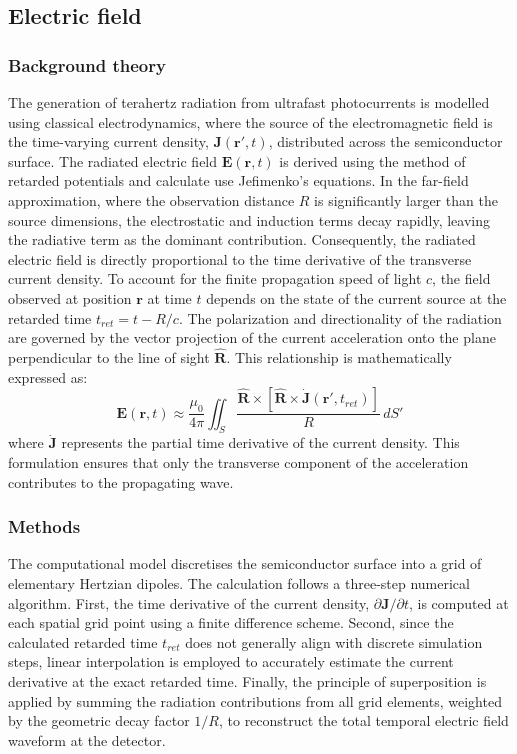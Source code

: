 \documentclass[12pt]{interim_report}
\begin{document}
\subsection{Electric field}
\subsubsection{Background theory}
The generation of terahertz radiation from ultrafast photocurrents is modelled using classical electrodynamics, where the source of the electromagnetic field is the time-varying current density, $\mathbf{J}(\mathbf{r}', t)$, distributed across the semiconductor surface. The radiated electric field $\mathbf{E}(\mathbf{r}, t)$ is derived using the method of retarded potentials and calculate use Jefimenko's equations. In the far-field approximation, where the observation distance $R$ is significantly larger than the source dimensions, the electrostatic and induction terms decay rapidly, leaving the radiative term as the dominant contribution. Consequently, the radiated electric field is directly proportional to the time derivative of the transverse current density\cite{SimulationTHz}.\newline
To account for the finite propagation speed of light $c$, the field observed at position $\mathbf{r}$ at time $t$ depends on the state of the current source at the retarded time $t_{ret} = t - R/c$. The polarization and directionality of the radiation are governed by the vector projection of the current acceleration onto the plane perpendicular to the line of sight $\hat{\mathbf{R}}$. This relationship is mathematically expressed as:
\begin{equation}
    \mathbf{E}(\mathbf{r}, t) \approx \frac{\mu_0}{4\pi} \iint_{S} \frac{\hat{\mathbf{R}} \times [\hat{\mathbf{R}} \times \dot{\mathbf{J}}(\mathbf{r}', t_{ret})]}{R} \, dS'
\end{equation}
where $\dot{\mathbf{J}}$ represents the partial time derivative of the current density. This formulation ensures that only the transverse component of the acceleration contributes to the propagating wave.
\newpage
\subsubsection{Methods}
The computational model discretises the semiconductor surface into a grid of elementary Hertzian dipoles. The calculation follows a three-step numerical algorithm. First, the time derivative of the current density, $\partial \mathbf{J}/\partial t$, is computed at each spatial grid point using a finite difference scheme. Second, since the calculated retarded time $t_{ret}$ does not generally align with discrete simulation steps, linear interpolation is employed to accurately estimate the current derivative at the exact retarded time. Finally, the principle of superposition is applied by summing the radiation contributions from all grid elements, weighted by the geometric decay factor $1/R$, to reconstruct the total temporal electric field waveform at the detector.
\end{document}

